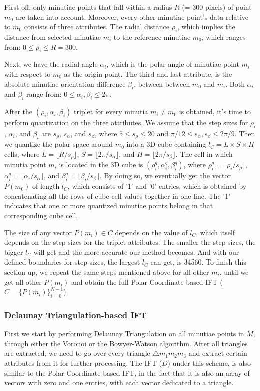 \documentclass[fyp]{socreport}
\begin{document}
First off, only minutiae points that fall within a radius $R$ (= 300 pixels) of point $m_0$ are taken into account. Moreover, every other minutiae point's data relative to $m_0$ consists of three attributes. The radial distance $\rho_i$, which implies the distance from selected minutiae $m_i$ to the reference minutiae $m_0$, which ranges from: $0 \le \rho_i \le R = 300$.

Next, we have the radial angle $\alpha_i$, which is the polar angle of minutiae point $m_i$ with respect to $m_0$ as the origin point. The third and last attribute, is the absolute minutiae orientation difference $\beta_i$, between between $m_0$ and $m_i$. Both $\alpha_i$ and $\beta_i$ range from: $0 \le \alpha_i, \beta_i \le 2\pi$.

After the $(\rho_i, \alpha_i, \beta_i)$ triplet for every minutia $m_i \neq m_0$ is obtained, it's time to perform quantization on the three attributes. We assume that the step sizes for $\rho_i$, $\alpha_i$, and $\beta_i$ are $s_{\rho}$, $s_{\alpha}$, and $s_{\beta}$, where $5 \leq s_{\rho} \leq 20$ and $\pi/12 \leq s_{\alpha}, s_{\beta} \leq 2\pi/9$. Then we quantize the polar space around $m_0$ into a 3D cube containing $l_C = L \times S \times H$ cells, where $L = \lfloor R / s_{\rho} \rfloor$, $S = \lfloor 2\pi / s_{\alpha} \rfloor$, and $H = \lfloor 2\pi / s_{\beta} \rfloor$. The cell in which minutia point $m_i$ is located in the 3D cube is $(\rho^q_i, \alpha^q_i, \beta^q_i)$, where $\rho^q_i = \lfloor \rho_i / s_{\rho}\rfloor$, $\alpha^q_i = \lfloor \alpha_i / s_{\alpha} \rfloor$, and $\beta^q_i = \lfloor \beta_i / s_{\beta} \rfloor$. By doing so, we eventually get the vector $P(m_0)$ of length $l_C$, which consists of '1' and '0' entries, which is obtained by concatenating all the rows of cube cell values together in one line. The '1' indicates that one or more quantized minutiae points belong in that corresponding cube cell.

The size of any vector $P(m_i) \in C$ depends on the value of $l_C$, which itself depends on the step sizes for the triplet attributes. The smaller the step sizes, the bigger $l_C$ will get and the more accurate our method becomes. And with our defined boundaries for step sizes, the largest $l_C$ can get, is 34560. To finish this section up, we repeat the same steps mentioned above for all other $m_i$, until we get all other $P(m_i)$ and obtain the full Polar Coordinate-based IFT ($C = \{P(m_i)\}_{i=0}^{N-1}$).



\subsubsection{Delaunay Triangulation-based IFT}
First we start by performing Delaunay Triangulation on all minutiae points in $M$, through either the Voronoi or the Bowyer-Watson algorithm. After all triangles are extracted, we need to go over every triangle $\triangle m_1m_2m_3$ and extract certain attributes from it for further processing. The IFT ($D$) under this scheme, is also similar to the Polar Coordinate-based IFT, in the fact that it is also an array of vectors with zero and one entries, with each vector dedicated to a triangle.
\end{document}
